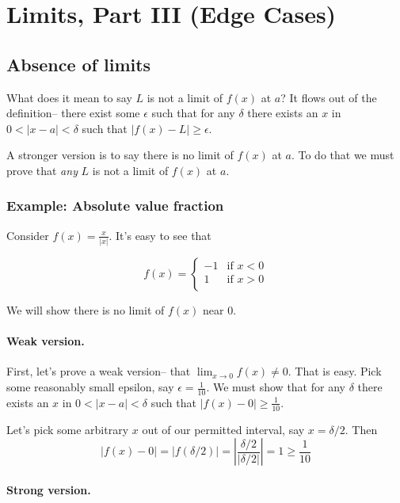\section{Limits, Part III (Edge Cases)}

\subsection{Absence of limits}

What does it mean to say $L$ is not a limit of $f(x)$ at $a$? It flows
out of the definition-- there exist some $\epsilon$ such that for any
$\delta$ there exists an $x$ in $0<|x-a|<\delta$ such that $|f(x)-L|\geq\epsilon$.

\vs

A stronger version is to say there is no limit of $f(x)$ at $a$. To do
that we must prove that \textit{any} $L$ is not a limit of $f(x)$ at
$a$.

\subsubsection*{Example: Absolute value fraction}

Consider $f(x)=\frac{x}{|x|}$. It's easy to see that

\[f(x)=\begin{cases}
    -1 & \text{if } x<0\\
    1 & \text{if } x>0\\
\end{cases}\]

We will show there is no limit of $f(x)$ near $0$.

\paragraph{Weak version.}

First, let's prove a weak version-- that $\lim_{x\to 0}f(x)\neq 0$. That is
easy. Pick some reasonably small epsilon, say $\epsilon=\frac{1}{10}$. We
must show that for any $\delta$ there exists an $x$ in
$0<|x-a|<\delta$ such that $|f(x)-0|\geq \frac{1}{10}$.

\vs

Let's pick some arbitrary $x$ out of our permitted interval, say $x=\delta/2$. Then
\[|f(x)-0|=|f(\delta/2)|=\left|\frac{\delta/2}{|\delta/2|}\right|=1\geq\frac{1}{10}\]


\paragraph{Strong version.}

